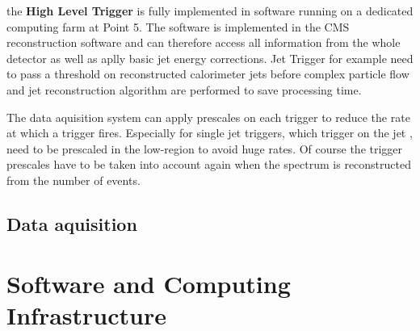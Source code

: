 the \textbf{High Level Trigger} is fully implemented in software running on a
dedicated computing farm at Point 5. The software is implemented in the CMS
reconstruction software and can therefore access all information from the whole
detector as well as aplly basic jet energy corrections. Jet Trigger for example
need to pass a \pt threshold on reconstructed calorimeter jets before complex
particle flow and jet reconstruction algorithm are performed to save processing
time.

The data aquisition system can apply prescales on each trigger to reduce the
rate at which a trigger fires. Especially for single jet triggers, which
trigger on the jet \pt, need to be prescaled in the low-\pt region to avoid huge
rates. Of course the trigger prescales have to be taken into account again when
the spectrum is reconstructed from the number of events.

\subsection{Data aquisition}

\section{Software and Computing Infrastructure}


